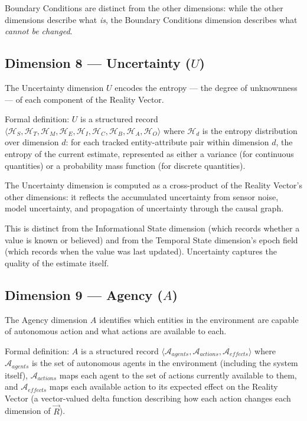 \documentclass[12pt]{article}
\begin{document}
Boundary Conditions are distinct from the other dimensions: while the other dimensions describe what \textit{is}, the Boundary Conditions dimension describes what \textit{cannot be changed}.

\subsection{Dimension 8 --- Uncertainty ($U$)}
\label{sec:uncertainty}

The Uncertainty dimension $U$ encodes the entropy --- the degree of unknownness --- of each component of the Reality Vector.

Formal definition: $U$ is a structured record $\langle \mathcal{H}_S, \mathcal{H}_T, \mathcal{H}_M, \mathcal{H}_E, \mathcal{H}_I, \mathcal{H}_C, \mathcal{H}_B, \mathcal{H}_A, \mathcal{H}_O \rangle$ where $\mathcal{H}_d$ is the entropy distribution over dimension $d$: for each tracked entity-attribute pair within dimension $d$, the entropy of the current estimate, represented as either a variance (for continuous quantities) or a probability mass function (for discrete quantities).

The Uncertainty dimension is computed as a cross-product of the Reality Vector's other dimensions: it reflects the accumulated uncertainty from sensor noise, model uncertainty, and propagation of uncertainty through the causal graph.

This is distinct from the Informational State dimension (which records whether a value is known or believed) and from the Temporal State dimension's epoch field (which records when the value was last updated). Uncertainty captures the quality of the estimate itself.

\subsection{Dimension 9 --- Agency ($A$)}
\label{sec:agency}

The Agency dimension $A$ identifies which entities in the environment are capable of autonomous action and what actions are available to each.

Formal definition: $A$ is a structured record $\langle \mathcal{A}_{agents}, \mathcal{A}_{actions}, \mathcal{A}_{effects} \rangle$ where $\mathcal{A}_{agents}$ is the set of autonomous agents in the environment (including the system itself), $\mathcal{A}_{actions}$ maps each agent to the set of actions currently available to them, and $\mathcal{A}_{effects}$ maps each available action to its expected effect on the Reality Vector (a vector-valued delta function describing how each action changes each dimension of $\vec{R}$).
\end{document}
